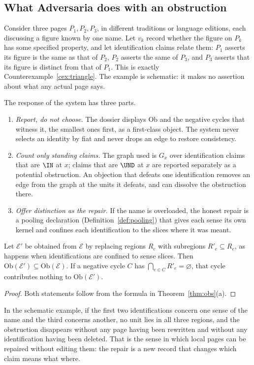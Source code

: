 \subsection{What Adversaria does with an obstruction}

Consider three pages $P_1,P_2,P_3$, in different traditions or language editions, each discussing a figure known by one name. Let $v_k$ record whether the figure on $P_k$ has some specified property, and let identification claims relate them: $P_1$ asserts its figure is the same as that of $P_2$, $P_2$ asserts the same of $P_3$, and $P_3$ asserts that its figure is distinct from that of $P_1$. This is exactly Counterexample~\ref{cex:triangle}. The example is schematic: it makes no assertion about what any actual page says.

The response of the system has three parts.
\begin{enumerate}
\item \emph{Report, do not choose.} The dossier displays $\mathrm{Ob}$ and the negative cycles that witness it, the smallest ones first, as a first-class object. The system never selects an identity by fiat and never drops an edge to restore consistency.
\item \emph{Count only standing claims.} The graph used is $G_x$ over identification claims that are $\IN$ at $x$; claims that are $\UND$ at $x$ are reported separately as a potential obstruction. An objection that defeats one identification removes an edge from the graph at the units it defeats, and can dissolve the obstruction there.
\item \emph{Offer distinction as the repair.} If the name is overloaded, the honest repair is a pooling declaration (Definition~\ref{def:pooling}) that gives each sense its own kernel and confines each identification to the slices where it was meant.
\end{enumerate}

\begin{proposition}\label{prop:dissolve}
Let $\mathcal E'$ be obtained from $\mathcal E$ by replacing regions $R_e$ with subregions $R'_e\subseteq R_e$, as happens when identifications are confined to sense slices. Then $\mathrm{Ob}(\mathcal E')\subseteq\mathrm{Ob}(\mathcal E)$. If a negative cycle $C$ has $\bigcap_{e\in C}R'_e=\varnothing$, that cycle contributes nothing to $\mathrm{Ob}(\mathcal E')$.
\end{proposition}

\begin{proof}
Both statements follow from the formula in Theorem~\ref{thm:obs}(a).
\end{proof}

In the schematic example, if the first two identifications concern one sense of the name and the third concerns another, no unit lies in all three regions, and the obstruction disappears without any page having been rewritten and without any identification having been deleted. That is the sense in which local pages can be repaired without editing them: the repair is a new record that changes which claim means what where.
